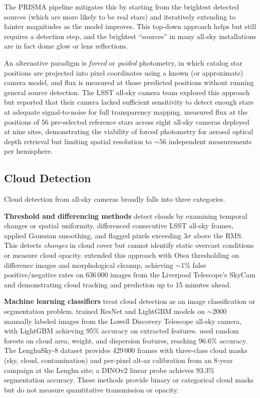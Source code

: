 The PRISMA pipeline \citep{barghini_astrometric_2019} mitigates this
by starting from the brightest detected sources (which are more likely to
be real stars) and iteratively extending to fainter magnitudes as the model
improves.  This top-down approach helps but still requires a detection
step, and the brightest ``sources'' in many all-sky installations are in
fact dome glow or lens reflections.

An alternative paradigm is \emph{forced} or \emph{guided} photometry, in
which catalog star positions are projected into pixel coordinates using a
known (or approximate) camera model, and flux is measured at those
predicted positions without running general source detection.  The
LSST all-sky camera team explored this approach
\citep{yoachim_smtn005_2016} but reported that their camera lacked
sufficient sensitivity to detect enough stars at adequate signal-to-noise
for full transparency mapping.  \citet{roman_aod_2025} measured flux at
the positions of 56 pre-selected reference stars across eight all-sky
cameras deployed at nine sites, demonstrating the viability of forced
photometry for aerosol optical depth retrieval but limiting spatial
resolution to $\sim$56 independent measurements per hemisphere.

\subsection{Cloud Detection}
\label{sec:litreview:clouds}

Cloud detection from all-sky cameras broadly falls into three categories.

\textbf{Threshold and differencing methods} detect clouds by examining
temporal changes or spatial uniformity.  \citet{yoachim_smtn005_2016}
differenced consecutive LSST all-sky frames, applied Gaussian smoothing,
and flagged pixels exceeding $3\sigma$ above the RMS.  This detects
\emph{changes} in cloud cover but cannot identify static overcast
conditions or measure cloud opacity.  \citet{buntin_cloud_2025} extended
this approach with Otsu thresholding on difference images and
morphological cleanup, achieving $\sim$1\% false positive/negative rates
on 636\,000 images from the Liverpool Telescope's SkyCam and demonstrating
cloud tracking and prediction up to 15 minutes ahead.

\textbf{Machine learning classifiers} treat cloud detection as an image
classification or segmentation problem.  \citet{mommert_cloudynight_2020}
trained ResNet and LightGBM models on $\sim$2000 manually labeled images
from the Lowell Discovery Telescope all-sky camera, with LightGBM achieving
95\% accuracy on extracted features.  \citet{li_classification_2022} used
random forests on cloud area, weight, and dispersion features, reaching
96.6\% accuracy.  The LenghuSky-8 dataset \citep{rui_lenghusky_2025}
provides 429\,000 frames with three-class cloud masks (sky, cloud,
contamination) and per-pixel alt-az calibration from an 8-year campaign at
the Lenghu site; a DINOv2 linear probe achieves 93.3\% segmentation
accuracy.  These methods provide binary or categorical cloud masks but do
not measure quantitative transmission or opacity.

